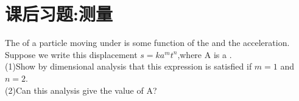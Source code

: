 	\section{课后习题:测量}
	
	\begin{example}
		The  of a particle moving under  is some function of the  and
		the acceleration. Suppose we write this displacement
		$s=ka^mt^n$,where A is a . \\
		(1)Show by
		dimensional analysis that this expression is satisfied if
		$m = 1$ and $n = 2$. \\
		(2)Can this analysis give the value of A?
	\end{example}

	

